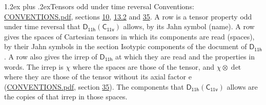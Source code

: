 \documentclass[10pt,a4paper]{article}
\makeatletter
\renewcommand\section{\@startsection{section}{1}{\z@}{-3ex plus -1ex minus -.2ex}%
  {1.2ex plus .2ex}{\normalfont\large\sffamily\bfseries\color{parttitle}}}
\numberwithin{equation}{section}
\newcommand{\grp}[1]{\mathsf{#1}}
\newcommand{\irrprod}{\otimes}
\makeatother
\begin{document}
\section{Tensors odd under time reversal}\label{s:time_odd}
Conventions: \href{../../CONVENTIONS.pdf}{CONVENTIONS.pdf}, sections \href{../../../rotation/CONVENTIONS.pdf\#conv.10}{10}, \href{../../../rotation/CONVENTIONS.pdf\#conv.13.2}{13.2} and \href{../../CONVENTIONS.pdf\#conv.35}{35}.
\leavevmode\label{n:head.name.property}A row is a tensor property odd under time reversal that $\grp{D_{11h}}(\grp{C_{11v}})$ allows, by its Jahn symbol (name). \label{n:head.spaces}A row gives the spaces of Cartesian tensors in which its components are read (spaces), by their Jahn symbols in the section Isotypic components of the document of \href{../../../rotation/data/pdf/D11h.pdf}{$\grp{D_{11h}}$}. \label{n:head.properties}A row also gives the irrep of $\grp{D_{11h}}$ at which they are read and the properties in words. The irrep is $\chi$ where the spaces are those of the tensor, and $\chi \irrprod \det$ where they are those of the tensor without its axial factor e (\href{../../CONVENTIONS.pdf}{CONVENTIONS.pdf}, section \href{../../CONVENTIONS.pdf\#conv.35}{35}). The components that $\grp{D_{11h}}(\grp{C_{11v}})$ allows are the copies of that irrep in those spaces.
\end{document}
